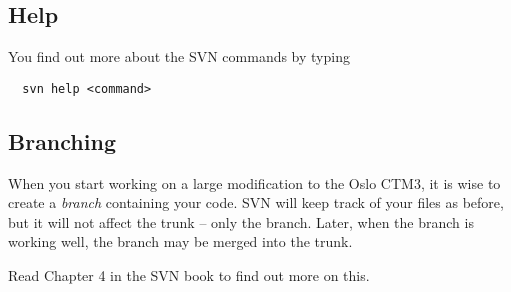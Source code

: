 \documentclass[10pt,a4paper,twocolumn]{article}
\newcommand{\model}{Oslo CTM3}
\begin{document}
\subsection{Help}
You find out more about the SVN commands by typing
\begin{verbatim}
  svn help <command>
\end{verbatim}


\subsection{Branching}
When you start working on a large modification to the \model, it is
wise to create a {\it branch} containing your code. SVN will keep
track of your files as before, but it will not affect the trunk --
only the branch.
Later, when the branch is working well, the branch may be merged into
the trunk.

Read Chapter 4 in the SVN book to find out more on this.



\end{document}

